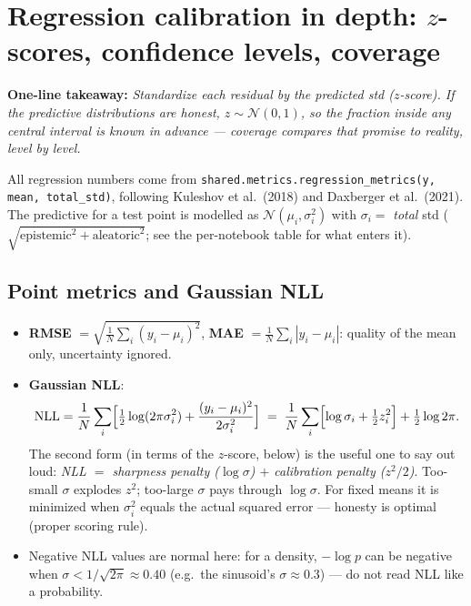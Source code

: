 \documentclass[10pt,a4paper]{article}
\newcommand{\code}[1]{\texttt{#1}}
\newcommand{\takeaway}[1]{\textbf{One-line takeaway:} \emph{#1}}
\begin{document}
\section{Regression calibration in depth: $z$-scores, confidence levels, coverage}\label{sec:regcal}
\takeaway{Standardize each residual by the predicted std ($z$-score). If the predictive
distributions are honest, $z\sim\mathcal{N}(0,1)$, so the fraction inside any central interval is
known in advance --- coverage compares that promise to reality, level by level.}

All regression numbers come from \code{shared.metrics.regression\_metrics(y, mean, total\_std)},
following Kuleshov et al.\ (2018) and Daxberger et al.\ (2021). The predictive for a test point is
modelled as $\mathcal{N}(\mu_i,\sigma_i^2)$ with $\sigma_i=$ \emph{total} std
($\sqrt{\text{epistemic}^2+\text{aleatoric}^2}$; see the per-notebook table for what enters it).

\subsection{Point metrics and Gaussian NLL}
\begin{itemize}
\item \textbf{RMSE} $=\sqrt{\frac1N\sum_i(y_i-\mu_i)^2}$, \textbf{MAE} $=\frac1N\sum_i|y_i-\mu_i|$:
  quality of the mean only, uncertainty ignored.
\item \textbf{Gaussian NLL}:
  \[
  \mathrm{NLL}=\frac1N\sum_i\Bigl[\tfrac12\log(2\pi\sigma_i^2)+\frac{(y_i-\mu_i)^2}{2\sigma_i^2}\Bigr]
  \;=\;\frac1N\sum_i\Bigl[\log\sigma_i+\tfrac12 z_i^2\Bigr]+\tfrac12\log 2\pi .
  \]
  The second form (in terms of the $z$-score, below) is the useful one to say out loud:
  \emph{NLL $=$ sharpness penalty ($\log\sigma$) $+$ calibration penalty ($z^2/2$)}. Too-small
  $\sigma$ explodes $z^2$; too-large $\sigma$ pays through $\log\sigma$. For fixed means it is
  minimized when $\sigma_i^2$ equals the actual squared error --- honesty is optimal (proper
  scoring rule).
\item Negative NLL values are normal here: for a density, $-\log p$ can be negative when
  $\sigma<1/\sqrt{2\pi}\approx0.40$ (e.g.\ the sinusoid's $\sigma\approx0.3$) --- do not read NLL
  like a probability.
\end{itemize}
\end{document}
